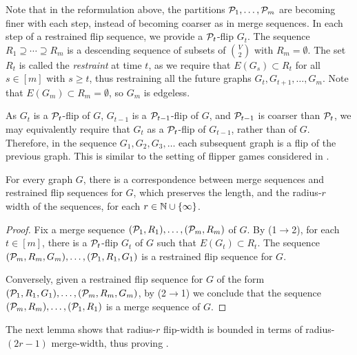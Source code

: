 Note that in the reformulation above,
the partitions $\cal P_1,\ldots,\cal P_m$ are becoming finer with each step, instead of becoming coarser as in merge sequences. In each step of a restrained flip sequence, we provide a $\cal P_t$-flip $G_t$.
The sequence $R_1\supseteq \cdots\supseteq R_m$
is a descending sequence of subsets of $V\choose 2$ with $R_m=\emptyset$. The set $R_t$ is called the \emph{restraint} at time $t$, as we require that $E(G_s)\subset R_t$ for all $s\in[m]$ with $s\ge t$, thus restraining all the future graphs $G_t,G_{t+1},\ldots,G_m$.  Note that  $E(G_m)\subset R_m=\emptyset$, so $G_m$ is edgeless.

As $G_t$ is a $\cal P_t$-flip of $G$, 
$G_{t-1}$ is a $\cal P_{t-1}$-flip of $G$, and $\cal P_{t-1}$ is coarser than $\cal P_t$,
we may equivalently require that $G_t$ as a $\cal P_{t}$-flip of $G_{t-1}$, rather than of $G$.
Therefore, in the sequence $G_1,G_2,G_3,\ldots$ 
each subsequent graph is a flip of the previous graph.
This is similar to the setting of flipper games considered in \cite{flippers}.




\begin{lemma}\label{lem:mw-flip seq}
    For every graph $G$,
    there is a correspondence between merge sequences and restrained flip sequences for $G$,
    which preserves the length, and the radius-$r$ width of the sequences, for each $r\in\N\cup\set{\infty}$.
\end{lemma}




\begin{proof}
    Fix a merge sequence 
    $(\cal P_1,R_1),\ldots,(\cal P_m,R_m)$
    of $G$.
 By  (1$\rightarrow$2),
 for each $t\in[m]$,
    there is a  $\cal P_t$-flip $G_t$ of $G$ such that 
$E(G_t)\subset R_t$.
    The sequence 
    $(\cal P_m,R_m,G_m),\ldots,(\cal P_1,R_1,G_1)$
    is a restrained flip sequence for $G$.
    
    Conversely,
    given a restrained flip sequence for $G$ of the form $(\cal P_1,R_1,G_1),\ldots,(\cal P_m,R_m,G_m)$,
    by  (2$\rightarrow$1) we conclude that 
    the sequence $(\cal P_m,R_m),\ldots,(\cal P_1,R_1)$ is a merge sequence of $G$.
\end{proof}










The next lemma shows that radius-$r$ flip-width is bounded in terms of radius-$(2r-1)$ merge-width, thus proving .




